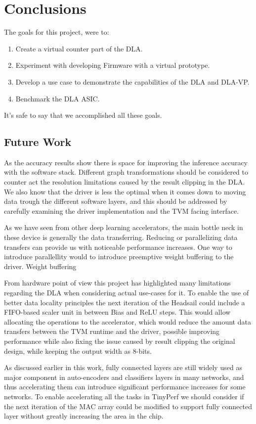 \documentclass[12pt,a4paper,english
]{tunithesis}
\begin{document}
\chapter{Conclusions}
\label{ch:conclusions}
The goals for this project, were to:
\begin{enumerate}
  \item Create a virtual counter part of the DLA.
  \item Experiment with developing Firmware with a virtual prototype.
  \item Develop a use case to demonstrate the capabilities of the DLA and DLA-VP.
  \item Benchmark the DLA ASIC.
\end{enumerate}
It's safe to say that we accomplished all these goals.

\section{Future Work}
As the accuracy results show there is space for improving the inference accuracy with the software stack. Different graph transformations should be considered to counter act the resolution limitations caused by the result clipping in the DLA. We also know that the driver is less the optimal when it comes down to moving data trough the different software layers, and this should be addressed by carefully examining the driver implementation and the TVM facing interface.

As we have seen from other deep learning accelerators, the main bottle neck in these device is generally the data transferring. Reducing or parallelizing data transfers can provide us with noticeable performance increases. One way to introduce parallellity would to introduce preemptive weight buffering to the driver. Weight buffering

From hardware point of view this project has highlighted many limitations regarding the DLA when considering actual use-cases for it. To enable the use of better data locality principles the next iteration of the Headsail could include a FIFO-based scaler unit in between Bias and ReLU steps. This would allow allocating the  operations to the accelerator, which would reduce the amount data transfers between the TVM runtime and the driver, possible improving performance while also fixing the issue caused by result clipping the original design, while keeping the output width as 8-bits.

As discussed earlier in this work, fully connected layers are still widely used as major component in auto-encoders and classifiers layers in many networks, and thus accelerating them can introduce significant performance increases for some networks. To enable accelerating all the tasks in TinyPerf we should consider if the next iteration of the MAC array could be modified to support fully connected layer without greatly increasing the area in the chip.
\end{document}
